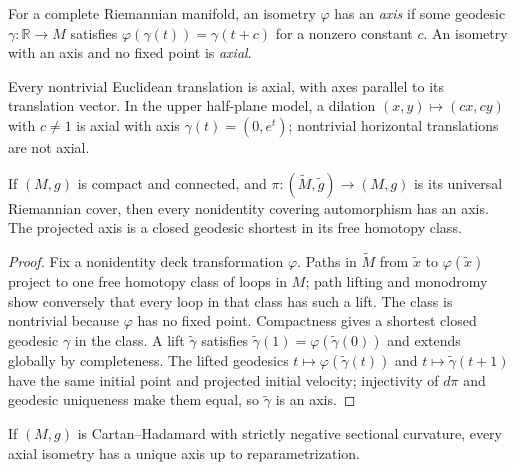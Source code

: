 For a complete Riemannian manifold, an isometry $\varphi$ has an \emph{axis} if
some geodesic $\gamma:\mathbb R\to M$ satisfies
$\varphi(\gamma(t))=\gamma(t+c)$ for a nonzero constant $c$.  An isometry with
an axis and no fixed point is \emph{axial}.

\begin{example}
\label{ex:axial-isometries}
Every nontrivial Euclidean translation is axial, with axes parallel to its
translation vector.  In the upper half-plane model, a dilation
$(x,y)\mapsto(cx,cy)$ with $c\ne1$ is axial with axis
$\gamma(t)=(0,e^t)$; nontrivial horizontal translations are not axial.
\end{example}

\begin{lemma}
\label{lem:covering-automorphism-axis}
If $(M,g)$ is compact and connected, and
$\pi:(\widetilde M,\widetilde g)\to(M,g)$ is its universal Riemannian cover,
then every nonidentity covering automorphism has an axis.  The projected axis
is a closed geodesic shortest in its free homotopy class.
\end{lemma}

\begin{proof}
\sketch
Fix a nonidentity deck transformation $\varphi$.  Paths in $\widetilde M$
from $\widetilde x$ to $\varphi(\widetilde x)$ project to one free homotopy
class of loops in $M$; path lifting and monodromy show conversely that every
loop in that class has such a lift.  The class is nontrivial because $\varphi$
has no fixed point.  Compactness gives a shortest closed geodesic $\gamma$ in
the class.  A lift $\widetilde\gamma$ satisfies
$\widetilde\gamma(1)=\varphi(\widetilde\gamma(0))$ and extends globally by
completeness.  The lifted geodesics
$t\mapsto\varphi(\widetilde\gamma(t))$ and
$t\mapsto\widetilde\gamma(t+1)$ have the same initial point and projected
initial velocity; injectivity of $d\pi$ and geodesic uniqueness make them
equal, so $\widetilde\gamma$ is an axis.
\end{proof}

\begin{lemma}
\label{lem:unique-axis-cartan-hadamard}

If $(M,g)$ is Cartan--Hadamard with strictly negative sectional curvature, every
axial isometry has a unique axis up to reparametrization.
\end{lemma}

